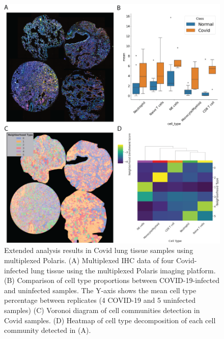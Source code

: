 \begin{figure}[hp]
\renewcommand{\figurename}{Figure}
    \centering
    \includegraphics[width=0.9\columnwidth]{Chapter3/Figures/Chap3_Apendix_covid.png}
    \caption[Analysis results in Covid tissue samples using multiplexed Polaris]{Extended analysis results in Covid lung tissue samples using multiplexed Polaris. (A) Multiplexed IHC data of four Covid-infected lung tissue using the multiplexed Polaris imaging platform. (B) Comparison of cell type proportions between COVID-19-infected and uninfected samples. The Y-axis shows the mean cell type percentage between replicates (4 COVID-19 and 5 uninfected samples) (C) Voronoi diagram of cell communities detection in Covid samples. (D) Heatmap of cell type decomposition of each cell community detected in (A).}
    \label{fig:Chap3_Covid_project}
\end{figure}

